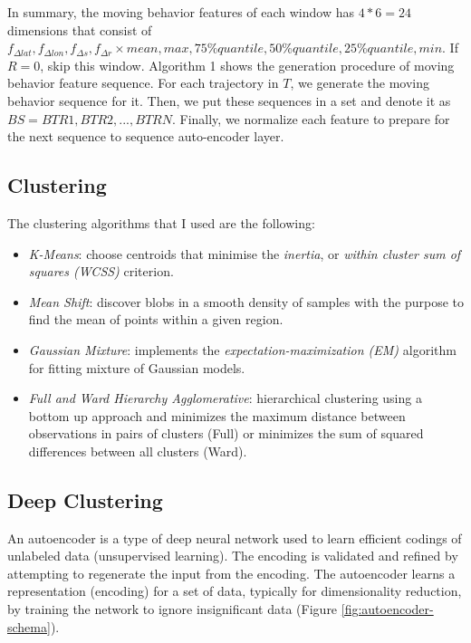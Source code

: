 In summary, the moving behavior features of each window has $4 * 6 = 24$ dimensions that consist of ${f_{\Delta lat}, f_{\Delta lon}, f_{\Delta s}, f_{\Delta r}} \times {mean, max, 75\%quantile, 50\%quantile, 25\%quantile, min}$.
If $R = 0$,  skip this window. Algorithm 1 shows the generation procedure of moving behavior feature sequence.
For each trajectory in $T$, we generate the moving behavior sequence for it. Then, we put these sequences in a set and denote it as $BS = {BTR1,BTR2,...,BTRN}$. Finally, we normalize each feature to prepare for the next sequence to sequence auto-encoder layer.

\subsection{Clustering}

The clustering algorithms that I used are the following: 
\begin{itemize}
	\item \textit{K-Means}: choose centroids that minimise the \textit{inertia}, or \textit{within cluster sum of squares (WCSS)} criterion.
	\item \textit{Mean Shift}: discover blobs in a smooth density of samples with the purpose to find the mean of points within a given region. 
	\item \textit{Gaussian Mixture}: implements the \textit{expectation-maximization (EM)} algorithm for fitting mixture of Gaussian models. 
	\item \textit{Full and Ward Hierarchy Agglomerative}: hierarchical clustering using a bottom up approach and minimizes the maximum distance between observations in pairs of clusters (Full) or minimizes the sum of squared differences between all clusters (Ward). 
\end{itemize}

\subsection{Deep Clustering}

An autoencoder is a type of deep neural network used to learn efficient codings of unlabeled data (unsupervised learning). The encoding is validated and refined by attempting to regenerate the input from the encoding. The autoencoder learns a representation (encoding) for a set of data, typically for dimensionality reduction, by training the network to ignore insignificant data (Figure \ref{fig:autoencoder-schema}). 

